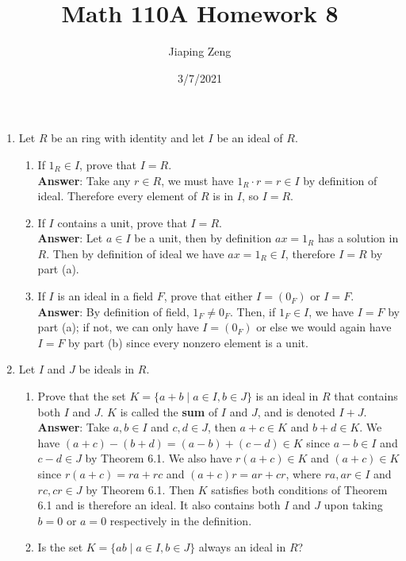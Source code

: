 \documentclass{article}
\title{Math 110A Homework 8}
\date{3/7/2021}
\author{Jiaping Zeng}
\begin{document}
\maketitle

\begin{enumerate}
      \item Let $R$ be an ring with identity and let $I$ be an ideal of $R$.
            \begin{enumerate}
                  \item If $1_R\in I$, prove that $I=R$.\\
                        \textbf{Answer}: Take any $r\in R$, we must have $1_R\cdot r=r\in I$ by definition of ideal. Therefore every element of $R$ is in $I$, so $I=R$.
                  \item If $I$ contains a unit, prove that $I=R$.\\
                        \textbf{Answer}: Let $a\in I$ be a unit, then by definition $ax=1_R$ has a solution in $R$. Then by definition of ideal we have $ax=1_R\in I$, therefore $I=R$ by part (a).
                  \item If $I$ is an ideal in a field $F$, prove that either $I=(0_F)$ or $I=F$.\\
                        \textbf{Answer}: By definition of field, $1_F\neq 0_F$. Then, if $1_F\in I$, we have $I=F$ by part (a); if not, we can only have $I=(0_F)$ or else we would again have $I=F$ by part (b) since every nonzero element is a unit.
            \end{enumerate}
      \item Let $I$ and $J$ be ideals in $R$.
            \begin{enumerate}
                  \item Prove that the set $K=\{a+b\mid a\in I, b\in J\}$ is an ideal in $R$ that contains both $I$ and $J$. $K$ is called the \textbf{sum} of $I$ and $J$, and is denoted $I+J$.\\
                        \textbf{Answer}: Take $a,b\in I$ and $c,d\in J$, then $a+c\in K$ and $b+d\in K$. We have $(a+c)-(b+d)=(a-b)+(c-d)\in K$ since $a-b\in I$ and $c-d\in J$ by Theorem 6.1. We also have $r(a+c)\in K$ and $(a+c)\in K$ since $r(a+c)=ra+rc$ and $(a+c)r=ar+cr$, where $ra,ar\in I$ and $rc,cr\in J$ by Theorem 6.1. Then $K$ satisfies both conditions of Theorem 6.1 and is therefore an ideal. It also contains both $I$ and $J$ upon taking $b=0$ or $a=0$ respectively in the definition.
                  \item Is the set $K=\{ab\mid a\in I, b\in J\}$ always an ideal in $R$?\\

\end{enumerate}
\end{enumerate}
\end{document}
